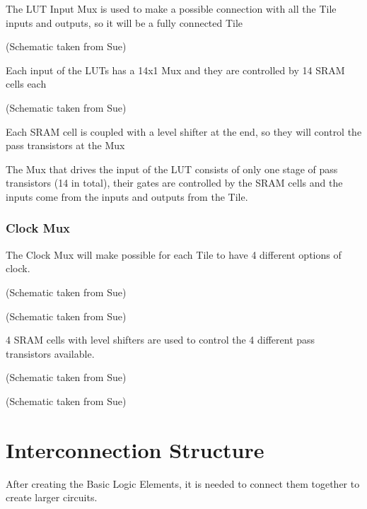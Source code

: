 \documentclass[letterpaper,10pt,english]{sphinxmanual}
\begin{document}
The LUT Input Mux is used to make a possible connection with all the Tile inputs and outputs, so it will be a fully connected Tile

\noindent{}

(Schematic taken from Sue)

Each input of the LUTs has a 14x1 Mux and they are controlled by 14 SRAM cells each

\noindent{}

(Schematic taken from Sue)

Each SRAM cell is coupled with a level shifter at the end, so they will control the pass transistors at the Mux

\noindent{}

The Mux that drives the input of the LUT consists of only one stage of pass transistors (14 in total), their gates are controlled by the SRAM cells and the inputs come from the inputs and outputs from the Tile.


\subsection{Clock Mux}
\label{clockmux:clock-mux}\label{clockmux::doc}
\noindent{}

The Clock Mux will make possible for each Tile to have 4 different options of clock.

\noindent{}

(Schematic taken from Sue)

\noindent{}

(Schematic taken from Sue)

4 SRAM cells with level shifters are used to control the 4 different pass transistors available.

\noindent{}

(Schematic taken from Sue)

\noindent{}

(Schematic taken from Sue)


\chapter{Interconnection Structure}
\label{index:interconnection-structure}
After creating the Basic Logic Elements, it is needed to connect them together to create larger circuits.
\end{document}
